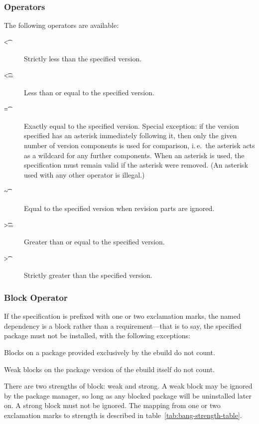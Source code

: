 \subsubsection{Operators}
\label{sec:dep-operator}

The following operators are available:

\begin{description}
\item[\t{<}] Strictly less than the specified version.
\item[\t{<=}] Less than or equal to the specified version.
\item[\t{=}] Exactly equal to the specified version. Special exception: if the version specified
    has an asterisk immediately following it, then only the given number of version components
    is used for comparison, i.\,e.\ the asterisk acts as a wildcard for any further components.
    When an asterisk is used, the specification must remain valid if the asterisk were removed.
    (An asterisk used with any other operator is illegal.)
\item[\t{\textasciitilde}] Equal to the specified version when revision parts are ignored.
\item[\t{>=}] Greater than or equal to the specified version.
\item[\t{>}] Strictly greater than the specified version.
\end{description}

\subsubsection{Block Operator}

If the specification is prefixed with one or two exclamation marks, the named dependency is a block
rather than a requirement---that is to say, the specified package must not be installed, with the
following exceptions:

\begin{compactitem}
\item Blocks on a package provided exclusively by the ebuild do not count. \label{provided-blocks}
\item Weak blocks on the package version of the ebuild itself do not count.
\end{compactitem}

 There are two strengths of block: weak and strong. A weak block may be
ignored by the package manager, so long as any blocked package will be uninstalled later on. A
strong block must not be ignored. The mapping from one or two exclamation marks to strength is
described in table~\ref{tab:bang-strength-table}.

